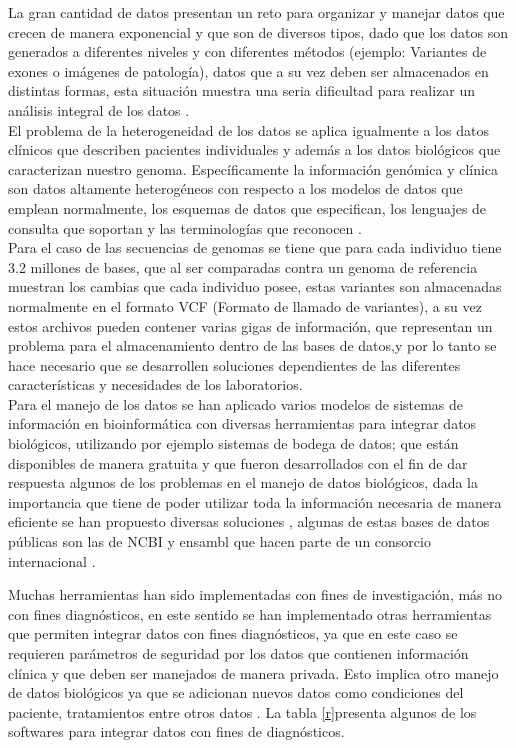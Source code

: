 La gran cantidad de datos presentan un reto para organizar y manejar datos que crecen de manera exponencial y que son de diversos tipos, dado que los datos son generados a diferentes niveles y con diferentes métodos (ejemplo: Variantes de exones o imágenes de patología), datos que a su vez deben ser almacenados en distintas formas, esta situación muestra una seria dificultad para realizar un análisis integral de los datos \cite{Cook2016,Li2014}.\\

El problema de la heterogeneidad  de los datos  se aplica igualmente a los datos clínicos que describen pacientes individuales y además a los datos biológicos que caracterizan nuestro genoma. Específicamente la información genómica y clínica son datos altamente heterogéneos con respecto a los modelos de datos que emplean normalmente, los esquemas de datos que especifican, los lenguajes de consulta que soportan y las terminologías que reconocen \cite{Sujansky2001}.\\

Para el caso de las secuencias de genomas se tiene que para cada individuo tiene 3.2 millones de bases, que al ser comparadas contra un genoma de referencia muestran los cambias que cada individuo posee, estas variantes son almacenadas normalmente en el formato VCF (Formato de llamado de variantes), a su vez estos archivos pueden contener varias gigas de información, que representan un problema para el almacenamiento dentro de las bases de datos,y por lo tanto se hace necesario que se desarrollen soluciones dependientes de las diferentes características y necesidades de los laboratorios\cite{Kutzera2017}.\\

Para el manejo de los datos se han aplicado varios modelos de sistemas de información en  bioinformática con diversas herramientas para integrar datos biológicos, utilizando por ejemplo sistemas de bodega de datos; que están disponibles de manera gratuita y que fueron desarrollados con el fin de dar respuesta algunos de los problemas en el manejo de datos biológicos, dada la importancia que tiene de poder utilizar toda la información necesaria de manera eficiente se han propuesto diversas soluciones \cite{Triplet2014}, algunas de estas bases de datos públicas son las de NCBI y ensambl  que hacen parte de un consorcio internacional \cite{Sherry2001,Yates2016}.

Muchas  herramientas han sido implementadas con fines de investigación, más no con fines diagnósticos,  en este sentido se han implementado otras herramientas que permiten integrar datos con fines diagnósticos, ya que en este caso se requieren parámetros de seguridad por los datos que contienen información clínica y que deben ser manejados de manera privada. Esto implica otro manejo de datos biológicos ya que se adicionan nuevos datos como condiciones del paciente, tratamientos entre otros datos \cite{Canuel2015}. La tabla \ref{r}presenta algunos de los softwares para integrar datos con fines de diagnósticos.\\

